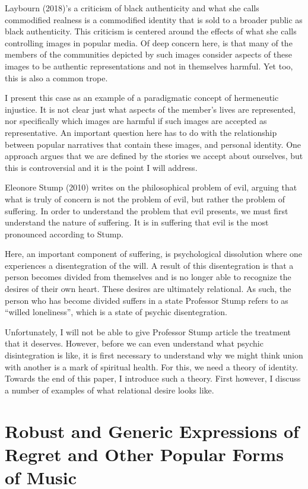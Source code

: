 \documentclass[
  letterpaper,
  DIV=11,
  numbers=noendperiod]{scrreprt}
\begin{document}
\begin{tcolorbox}[enhanced jigsaw, arc=.35mm, breakable, rightrule=.15mm, colback=white, colframe=quarto-callout-important-color-frame, bottomrule=.15mm, leftrule=.75mm, opacityback=0, toprule=.15mm, left=2mm]
\begin{tcolorbox}[enhanced jigsaw, arc=.35mm, breakable, rightrule=.15mm, colback=white, colframe=quarto-callout-tip-color-frame, bottomrule=.15mm, leftrule=.75mm, opacityback=0, toprule=.15mm, left=2mm]
Laybourn (2018)'s a criticism of black authenticity and what she calls
commodified realness is a commodified identity that is sold to a broader
public as black authenticity. This criticism is centered around the
effects of what she calls controlling images in popular media. Of deep
concern here, is that many of the members of the communities depicted by
such images consider aspects of these images to be authentic
representations and not in themselves harmful. Yet too, this is also a
common trope.

I present this case as an example of a paradigmatic concept of
hermeneutic injustice. It is not clear just what aspects of the member's
lives are represented, nor specifically which images are harmful if such
images are accepted as representative. An important question here has to
do with the relationship between popular narratives that contain these
images, and personal identity. One approach argues that we are defined
by the stories we accept about ourselves, but this is controversial and
it is the point I will address.

Eleonore Stump (2010) writes on the philosophical problem of evil,
arguing that what is truly of concern is not the problem of evil, but
rather the problem of suffering. In order to understand the problem that
evil presents, we must first understand the nature of suffering. It is
in suffering that evil is the most pronounced according to Stump.

Here, an important component of suffering, is psychological dissolution
where one experiences a disentegration of the will. A result of this
disentegration is that a person becomes divided from themselves and is
no longer able to recognize the desires of their own heart. These
desires are ultimately relational. As such, the person who has become
divided suffers in a state Professor Stump refers to as ``willed
loneliness'', which is a state of psychic disentegration.

Unfortunately, I will not be able to give Professor Stump article the
treatment that it deserves. However, before we can even understand what
psychic disintegration is like, it is first necessary to understand why
we might think union with another is a mark of spiritual health. For
this, we need a theory of identity. Towards the end of this paper, I
introduce such a theory. First however, I discuss a number of examples
of what relational desire looks like.

\section{Robust and Generic Expressions of Regret and Other Popular
Forms of
Music}\label{robust-and-generic-expressions-of-regret-and-other-popular-forms-of-music}


\end{tcolorbox}
\end{tcolorbox}
\end{document}
